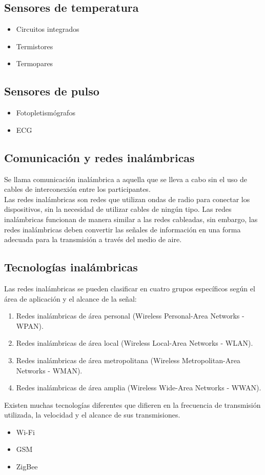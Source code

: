	\subsection{Sensores de temperatura}
		\begin{itemize}
			\item Circuitos integrados
			\item Termistores
			\item Termopares
		\end{itemize}
	\subsection{Sensores de pulso}
		\begin{itemize}
			\item Fotopletismógrafos
			\item ECG
		\end{itemize}
	
	\subsection{Comunicación y redes inalámbricas}
	Se llama comunicación inalámbrica a aquella que se lleva a cabo sin el uso de cables de interconexión entre los participantes.\\
	
	Las redes inalámbricas son redes que utilizan ondas de radio para conectar los dispositivos, sin la necesidad de utilizar cables de ningún tipo. Las redes inalámbricas funcionan de manera similar a las redes cableadas, sin embargo, las redes inalámbricas deben convertir las señales de información en una forma adecuada para la transmisión a través del medio de aire. 
	
	\subsection{Tecnologías inalámbricas}
	Las redes inalámbricas se pueden clasificar en cuatro grupos específicos según el área de aplicación y el alcance de la señal:
	\begin{enumerate}
		\item Redes inalámbricas de área personal (Wireless Personal-Area Networks - WPAN).
		\item Redes inalámbricas de área local (Wireless Local-Area Networks - WLAN).
		\item Redes inalámbricas de área metropolitana (Wireless Metropolitan-Area Networks - WMAN).
		\item Redes inalámbricas de área amplia (Wireless Wide-Area Networks - WWAN).
	\end{enumerate}
	
	Existen muchas tecnologías diferentes que difieren en la frecuencia de transmisión utilizada, la velocidad y el alcance de sus transmisiones. 
	
		\begin{itemize}
			\item Wi-Fi
			\item GSM
			\item ZigBee
		\end{itemize}	